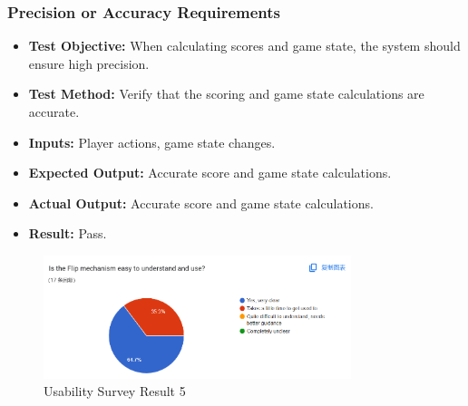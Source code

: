 \documentclass[12pt, titlepage]{article}
\begin{document}
\subsubsection{Precision or Accuracy Requirements}
\begin{itemize}
    \item \textbf{Test Objective:} When calculating scores and game state, the system should ensure high precision.
    \item \textbf{Test Method:} Verify that the scoring and game state calculations are accurate.
    \item \textbf{Inputs:} Player actions, game state changes.
    \item \textbf{Expected Output:} Accurate score and game state calculations.
    \item \textbf{Actual Output:} Accurate score and game state calculations.
    \item \textbf{Result:} Pass.
\end{itemize}
\begin{figure}[h!]
    \centering
    \includegraphics[width=0.8\textwidth]{image4.png}
    \caption{Usability Survey Result 5}
    \label{fig:labelname}
\end{figure}
\end{document}
